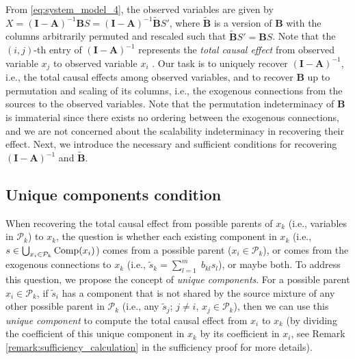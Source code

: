 \documentclass[12pt]{article}
\newcommand{\setP}{\mathcal{P}}
\newcommand{\bA}{\mathbf{A}}
\newcommand{\bB}{\mathbf{B}}
\newcommand{\bI}{\mathbf{I}}
\begin{document}
From \eqref{eq:system_model_4}, the observed variables are given by $X\!=\!(\mathbf{I}\!-\! \bA)^{-1}\bB S \!=\! (\mathbf{I}\!-\! \bA)^{-1} \tilde{\bB} S'$, where $\tilde{\bB}$ is a version of $\bB$ with the columns arbitrarily permuted and rescaled such that $\tilde{\bB} S'=\bB S$. Note that the $(i,j)$-th entry of $(\bI-\bA)^{-1}$ represents the {\it{total causal effect}} from observed variable $x_j$ to observed variable $x_i$ \citep{spirtes2000causation}.
Our task is to uniquely recover $(\bI-\bA)^{-1}$, i.e., the total causal effects among observed variables, and to recover $\bB$ up to permutation and scaling of its columns, i.e., the exogenous connections from the sources to the observed variables.
Note that the permutation indeterminacy of $\bB$ is immaterial since there exists no ordering between the exogenous connections, and we are not concerned about the scalability indeterminacy in recovering their effect. Next, we introduce the necessary and sufficient conditions for recovering $(\bI-\bA)^{-1}$ and $\tilde{\bB}$. 

\vspace{-4mm}
\subsection{Unique components condition} \label{sec:unique_component} \vspace{-1mm}
When recovering the total causal effect from possible parents of $x_k$ (i.e., variables in $\setP_k$) to $x_k$, the question is whether each existing component in $x_k$ (i.e., $s\in \bigcup_{x_i\in \mathcal{P}_k} {\rm{Comp}}(x_i)$) comes from a possible parent ($x_i\in\mathcal{P}_k$), or comes from the exogenous connections to $x_k$ (i.e., $\tilde{s}_k=\sum_{l=1}^m\; b_{kl} s_l$), or maybe both. To address this question, we propose the concept of {\it{unique components}}. For a possible parent $x_i\in\mathcal{P}_k$, 
if $\tilde{s}_i$ has a component that is not shared by the source mixture of any other possible parent in $\mathcal{P}_k$ (i.e., any $\tilde{s}_j$; $j\neq i$, $x_j\in\mathcal{P}_k$), then we can use this {\it{unique component}} to compute the total causal effect from $x_i$ to $x_k$ (by dividing the coefficient of this unique component in $x_k$ by its coefficient in $x_i$, see Remark \ref{remark:sufficiency_calculation} in the sufficiency proof for more details). 
\end{document}
